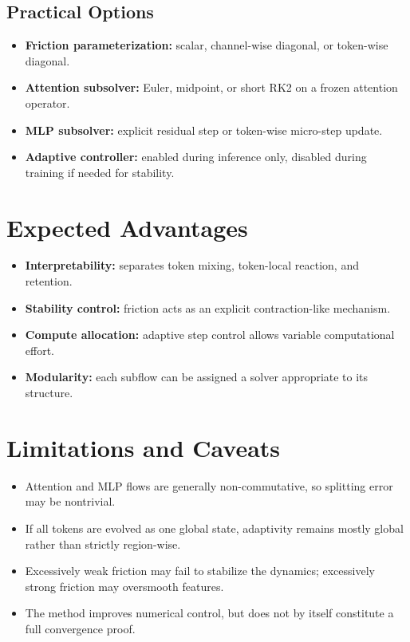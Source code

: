 \documentclass{article}
\begin{document}
\subsection{Practical Options}
\begin{itemize}[leftmargin=1.5em]
    \item \textbf{Friction parameterization:} scalar, channel-wise diagonal, or token-wise diagonal.
    \item \textbf{Attention subsolver:} Euler, midpoint, or short RK2 on a frozen attention operator.
    \item \textbf{MLP subsolver:} explicit residual step or token-wise micro-step update.
    \item \textbf{Adaptive controller:} enabled during inference only, disabled during training if needed for stability.
\end{itemize}

\section{Expected Advantages}
\begin{itemize}[leftmargin=1.5em]
    \item \textbf{Interpretability:} separates token mixing, token-local reaction, and retention.
    \item \textbf{Stability control:} friction acts as an explicit contraction-like mechanism.
    \item \textbf{Compute allocation:} adaptive step control allows variable computational effort.
    \item \textbf{Modularity:} each subflow can be assigned a solver appropriate to its structure.
\end{itemize}

\section{Limitations and Caveats}
\begin{itemize}[leftmargin=1.5em]
    \item Attention and MLP flows are generally non-commutative, so splitting error may be nontrivial.
    \item If all tokens are evolved as one global state, adaptivity remains mostly global rather than strictly region-wise.
    \item Excessively weak friction may fail to stabilize the dynamics; excessively strong friction may oversmooth features.
    \item The method improves numerical control, but does not by itself constitute a full convergence proof.
\end{itemize}
\end{document}
